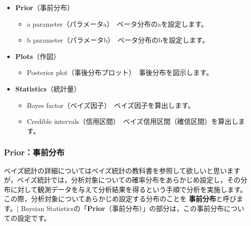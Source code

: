 \documentclass[
  12pt,
  a5jpaper,
  lualatex, ja=standard]{bxjsbook}
\providecommand{\tightlist}{%
  \setlength{\itemsep}{0pt}\setlength{\parskip}{0pt}}
\renewcommand{\emph}[1]{\textbf{\color{emph} #1}}
\newenvironment{jmvsettings}{%
	\begin{center}%
	\begin{tcolorbox}[%
		title=設定項目,
		colframe=gmoji,
		colbacktitle=gmoji,
		colback=gmoji!2!white,
		breakable,
		width=.9\textwidth,
		]\small\addtolength{\leftmargini}{-3\labelsep}%
	}%
	{\end{tcolorbox}\end{center}}
\begin{document}
\begin{jmvsettings}

\begin{itemize}
\tightlist
\item
  \textbf{Prior}（事前分布）

  \begin{itemize}
  \tightlist
  \item
    a parameter（パラメータa）　ベータ分布のaを設定します。
  \item
    b parameter（パラメータb）　ベータ分布のbを設定します。
  \end{itemize}
\item
  \textbf{Plots}（作図）

  \begin{itemize}
  \tightlist
  \item
    Posterior plot（事後分布プロット）　事後分布を図示します。
  \end{itemize}
\item
  \textbf{Statistics}（統計量）

  \begin{itemize}
  \tightlist
  \item
    Bayes factor（ベイズ因子）　ベイズ因子を算出します。
  \item
    Credible intervals（信用区間）　ベイズ信用区間（確信区間）を算出します。
  \end{itemize}
\end{itemize}

\end{jmvsettings}

\hypertarget{subsub:frequencies-binomial-bayes-prior}{%
\subsubsection*{Prior：事前分布}\label{subsub:frequencies-binomial-bayes-prior}}

ベイズ統計の詳細についてはベイズ統計の教科書を参照して欲しいと思いますが，ベイズ統計では，分析対象についての確率分布をあらかじめ設定し，その分布に対して観測データを与えて分析結果を得るという手順で分析を実施します。この際，分析対象についてあらかじめ設定する分布のことを\emph{事前分布}と呼びます。\colorbox{bar}{\textcolor{gmoji2}{| Baysian Statistics}}の「\textbf{Prior}（事前分布）」の部分は，この事前分布についての設定です。
\end{document}
